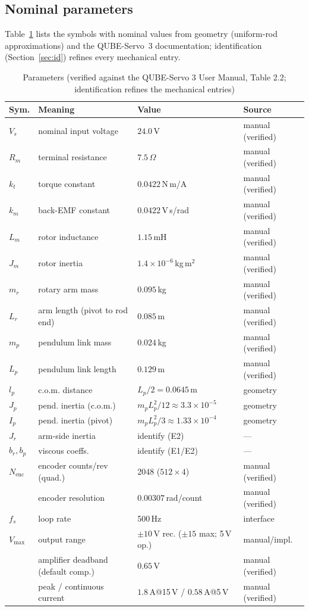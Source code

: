 \documentclass[conference]{IEEEtran}
\begin{document}
\subsection{Nominal parameters}
Table~\ref{tab:params} lists the symbols with nominal values from geometry (uniform-rod approximations) and the QUBE-Servo~3 documentation; identification (Section~\ref{sec:id}) refines every mechanical entry.
\begin{table}[t]
\caption{Parameters (verified against the QUBE-Servo 3 User Manual, Table 2.2; identification refines the mechanical entries)}
\label{tab:params}
\centering
\begin{tabular}{llll}
\toprule
Sym. & Meaning & Value & Source\\
\midrule
$V_s$ & nominal input voltage & $24.0\,$V & manual (verified)\\
$R_m$ & terminal resistance & $7.5\,\Omega$ & manual (verified)\\
$k_t$ & torque constant & $0.0422\,$N\,m/A & manual (verified)\\
$k_m$ & back-EMF constant & $0.0422\,$V\,s/rad & manual (verified)\\
$L_m$ & rotor inductance & $1.15\,$mH & manual (verified)\\
$J_m$ & rotor inertia & $1.4\times10^{-6}\,$kg\,m$^2$ & manual (verified)\\
$m_r$ & rotary arm mass & $0.095\,$kg & manual (verified)\\
$L_r$ & arm length (pivot to rod end) & $0.085\,$m & manual (verified)\\
$m_p$ & pendulum link mass & $0.024\,$kg & manual (verified)\\
$L_p$ & pendulum link length & $0.129\,$m & manual (verified)\\
$l_p$ & c.o.m. distance & $L_p/2 = 0.0645\,$m & geometry\\
$J_p$ & pend. inertia (c.o.m.) & $m_pL_p^2/12 \approx 3.3\times10^{-5}$ & geometry\\
$I_p$ & pend. inertia (pivot) & $m_pL_p^2/3 \approx 1.33\times10^{-4}$ & geometry\\
$J_r$ & arm-side inertia & identify (E2) & ---\\
$b_r,b_p$ & viscous coeffs. & identify (E1/E2) & ---\\
$N_{\mathrm{enc}}$ & encoder counts/rev (quad.) & 2048 ($512\times4$) & manual (verified)\\
 & encoder resolution & $0.00307\,$rad/count & manual (verified)\\
$f_s$ & loop rate & 500\,Hz & interface\\
$V_{\max}$ & output range & $\pm10$\,V rec. ($\pm15$ max; 5\,V op.) & manual/impl.\\
 & amplifier deadband (default comp.) & $0.65\,$V & manual (verified)\\
 & peak / continuous current & $1.8$\,A@15\,V / $0.58$\,A@5\,V & manual (verified)\\
\bottomrule
\end{tabular}
\end{table}
\end{document}
